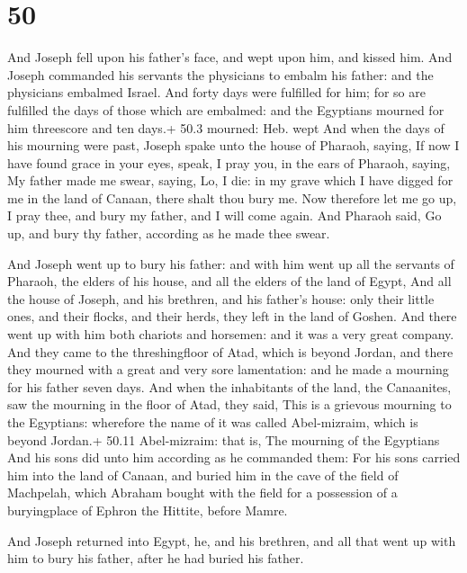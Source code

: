 \hypertarget{section-49}{%
\section{50}\label{section-49}}

 And Joseph fell upon his father's face, and wept upon him,
and kissed him.  And Joseph commanded his servants the
physicians to embalm his father: and the physicians embalmed Israel.
 And forty days were fulfilled for him; for so are fulfilled
the days of those which are embalmed: and the Egyptians mourned for him
threescore and ten days.+ 50.3 mourned: Heb. wept  And when
the days of his mourning were past, Joseph spake unto the house of
Pharaoh, saying, If now I have found grace in your eyes, speak, I pray
you, in the ears of Pharaoh, saying,  My father made me
swear, saying, Lo, I die: in my grave which I have digged for me in the
land of Canaan, there shalt thou bury me. Now therefore let me go up, I
pray thee, and bury my father, and I will come again.  And
Pharaoh said, Go up, and bury thy father, according as he made thee
swear.

 And Joseph went up to bury his father: and with him went
up all the servants of Pharaoh, the elders of his house, and all the
elders of the land of Egypt,  And all the house of Joseph,
and his brethren, and his father's house: only their little ones, and
their flocks, and their herds, they left in the land of Goshen.
 And there went up with him both chariots and horsemen: and
it was a very great company.  And they came to the
threshingfloor of Atad, which is beyond Jordan, and there they mourned
with a great and very sore lamentation: and he made a mourning for his
father seven days.  And when the inhabitants of the land,
the Canaanites, saw the mourning in the floor of Atad, they said, This
is a grievous mourning to the Egyptians: wherefore the name of it was
called Abel-mizraim, which is beyond Jordan.+ 50.11 Abel-mizraim: that
is, The mourning of the Egyptians  And his sons did unto
him according as he commanded them:  For his sons carried
him into the land of Canaan, and buried him in the cave of the field of
Machpelah, which Abraham bought with the field for a possession of a
buryingplace of Ephron the Hittite, before Mamre.

 And Joseph returned into Egypt, he, and his brethren,
and all that went up with him to bury his father, after he had buried
his father.

